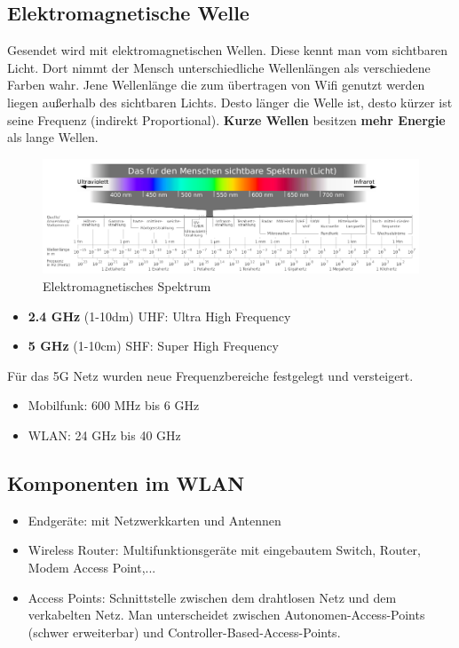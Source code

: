 \subsection*{Elektromagnetische Welle}
Gesendet wird mit elektromagnetischen Wellen. Diese kennt man vom sichtbaren Licht. Dort nimmt der Mensch unterschiedliche Wellenlängen als verschiedene Farben wahr. Jene Wellenlänge die zum übertragen von Wifi genutzt werden liegen außerhalb des sichtbaren Lichts. Desto länger die Welle ist, desto kürzer ist seine Frequenz (indirekt Proportional). \textbf{Kurze Wellen} besitzen \textbf{mehr Energie} als lange Wellen.
\begin{figure}[H]
	\centering
	\includegraphics[width=1.0\linewidth]{figures/elektro_spektrum.png}
	\caption{Elektromagnetisches Spektrum}
\end{figure}
\begin{itemize}
	\item \textbf{2.4 GHz} (1-10dm) UHF: Ultra High Frequency
	\item \textbf{5 GHz} (1-10cm) SHF: Super High Frequency
\end{itemize}
Für das 5G Netz wurden neue Frequenzbereiche festgelegt und versteigert.
\begin{itemize}
	\item Mobilfunk: 600 MHz bis 6 GHz
	\item WLAN: 24 GHz bis 40 GHz
\end{itemize}

\subsection*{Komponenten im WLAN}
\begin{itemize}
	\item Endgeräte: mit Netzwerkkarten und Antennen
	\item Wireless Router: Multifunktionsgeräte mit eingebautem Switch, Router, Modem Access Point,...
	\item Access Points: Schnittstelle zwischen dem drahtlosen Netz und dem verkabelten Netz. Man unterscheidet zwischen Autonomen-Access-Points (schwer erweiterbar) und Controller-Based-Access-Points.
\end{itemize}


